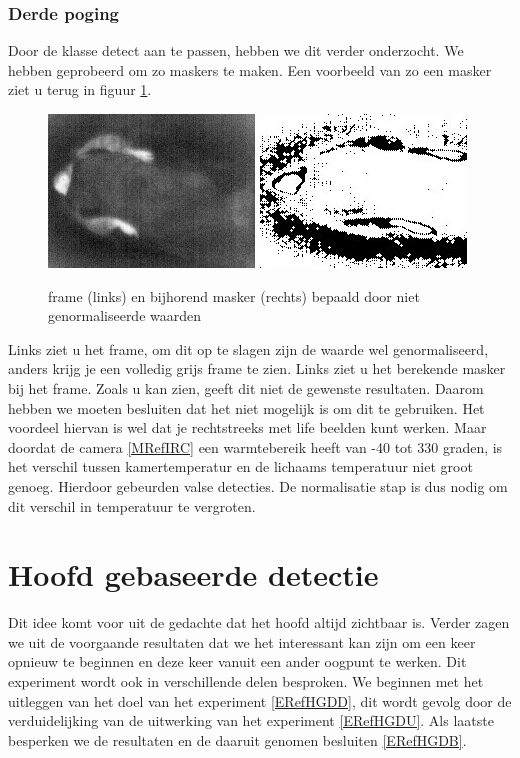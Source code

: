 \subsubsection{Derde poging}  
Door de klasse detect aan te passen, hebben we dit verder onderzocht.  We hebben geprobeerd om zo maskers te maken. Een voorbeeld van zo een masker ziet u terug in figuur \ref{imgNGn}. 
\begin{figure}[hbp]
	\includegraphics[scale = 0.75]{NotNormalizedFrame}
	\includegraphics[scale = 0.75]{NotNormalizedMask}
	\caption{frame (links) en bijhorend masker (rechts) bepaald door niet genormaliseerde waarden}
	\label{imgNGn}
\end{figure}
 Links ziet u het frame, om dit op te slagen zijn de waarde wel genormaliseerd, anders krijg je een volledig grijs frame te zien. Links ziet u het berekende masker bij het frame.  Zoals u kan zien, geeft dit niet de gewenste resultaten. Daarom hebben we moeten besluiten dat het niet mogelijk is om dit te gebruiken. Het voordeel hiervan is wel dat je rechtstreeks met life beelden kunt werken. Maar doordat de camera \ref{MRefIRC} een warmtebereik heeft van -40 tot 330 graden, is het verschil tussen kamertemperatur en de lichaams temperatuur niet groot genoeg. Hierdoor gebeurden valse detecties. De normalisatie stap is dus nodig om dit verschil in temperatuur te vergroten. 
 
 \section{Hoofd gebaseerde detectie}
 \label{ERefHGD}
 Dit idee komt voor uit de gedachte dat het hoofd altijd zichtbaar is. Verder zagen we uit de voorgaande resultaten dat we het interessant kan zijn om een keer opnieuw te beginnen en deze keer vanuit een ander oogpunt te werken. Dit experiment wordt ook in verschillende delen besproken. We beginnen met het uitleggen van het doel van het experiment \ref{ERefHGDD}, dit wordt gevolg door de verduidelijking van de uitwerking van het experiment \ref{ERefHGDU}. Als laatste besperken we de resultaten en de daaruit genomen besluiten \ref{ERefHGDB}.
 
